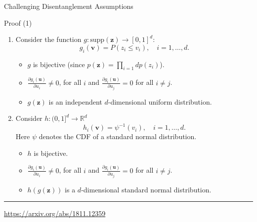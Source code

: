 \documentclass{beamer}
\newcommand{\bu}{\mathbf{u}}
\newcommand{\bv}{\mathbf{v}}
\newcommand{\bz}{\mathbf{z}}
\newcommand{\bbR}{\mathbb{R}}
\begin{document}
\begin{frame}{Challenging Disentanglement Assumptions}
	\begin{block}{Proof (1)}
		\begin{enumerate}
			\item 
			Consider the function $g: \text{supp}(\bz) \rightarrow [0, 1]^d$:
			\vspace{-0.1cm}
			\[
				g_i(\bv) = P(z_i \leq v_i), \quad i=1, \dots, d.
			\]
			\vspace{-0.4cm}
			\begin{itemize}
				\item $g$ is bijective (since $p(\bz) = \prod_{i=1}dp(z_i)$).
				\item $\frac{\partial g_i(\bu)}{\partial u_i} \neq 0$, for all $i$ and $\frac{\partial g_i(\bu)}{\partial u_j} = 0$ for all $i \neq j$.
				\item $g(\bz)$ is an independent $d$-dimensional uniform distribution.
			\end{itemize}
			\item 
			Consider $h: (0, 1]^d \rightarrow \bbR^d$
			\[
				h_i(\bv) = \psi^{-1}(v_i), \quad i= 1, \dots, d.
			\]
			Here $\psi$  denotes the CDF of a standard normal distribution.
			\begin{itemize}
				\item $h$ is bijective.
				\item $\frac{\partial g_i(\bu)}{\partial u_i} \neq 0$, for all $i$ and $\frac{\partial g_i(\bu)}{\partial u_j} = 0$ for all $i \neq j$.
				\item $h(g(\bz))$  is a $d$-dimensional standard normal distribution.
			\end{itemize}
		\end{enumerate}
	\end{block}
	
	\vfill
	\hrule\medskip
	{\scriptsize \href{https://arxiv.org/abs/1811.12359}{https://arxiv.org/abs/1811.12359}}
\end{frame}
\end{document}
